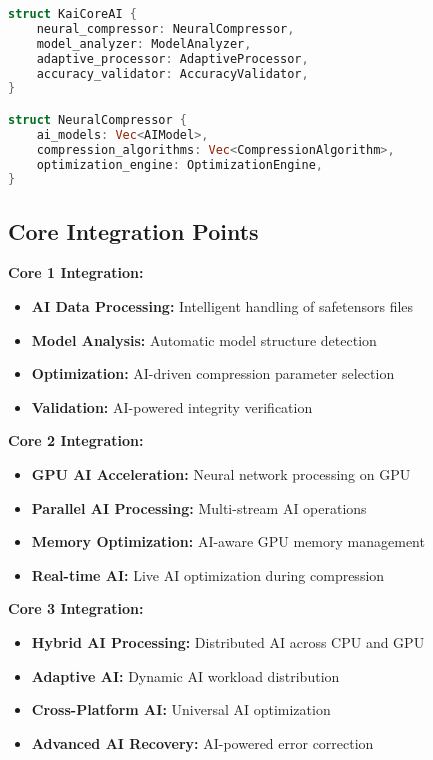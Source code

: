 \documentclass[12pt,a4paper]{article}
\begin{document}
\begin{lstlisting}[language=Rust, caption=Kai Core AI Architecture]
struct KaiCoreAI {
    neural_compressor: NeuralCompressor,
    model_analyzer: ModelAnalyzer,
    adaptive_processor: AdaptiveProcessor,
    accuracy_validator: AccuracyValidator,
}

struct NeuralCompressor {
    ai_models: Vec<AIModel>,
    compression_algorithms: Vec<CompressionAlgorithm>,
    optimization_engine: OptimizationEngine,
}
\end{lstlisting}

\subsection{Core Integration Points}

\textbf{Core 1 Integration:}
\begin{itemize}
    \item \textbf{AI Data Processing:} Intelligent handling of safetensors files
    \item \textbf{Model Analysis:} Automatic model structure detection
    \item \textbf{Optimization:} AI-driven compression parameter selection
    \item \textbf{Validation:} AI-powered integrity verification
\end{itemize}

\textbf{Core 2 Integration:}
\begin{itemize}
    \item \textbf{GPU AI Acceleration:} Neural network processing on GPU
    \item \textbf{Parallel AI Processing:} Multi-stream AI operations
    \item \textbf{Memory Optimization:} AI-aware GPU memory management
    \item \textbf{Real-time AI:} Live AI optimization during compression
\end{itemize}

\textbf{Core 3 Integration:}
\begin{itemize}
    \item \textbf{Hybrid AI Processing:} Distributed AI across CPU and GPU
    \item \textbf{Adaptive AI:} Dynamic AI workload distribution
    \item \textbf{Cross-Platform AI:} Universal AI optimization
    \item \textbf{Advanced AI Recovery:} AI-powered error correction
\end{itemize}
\end{document}
